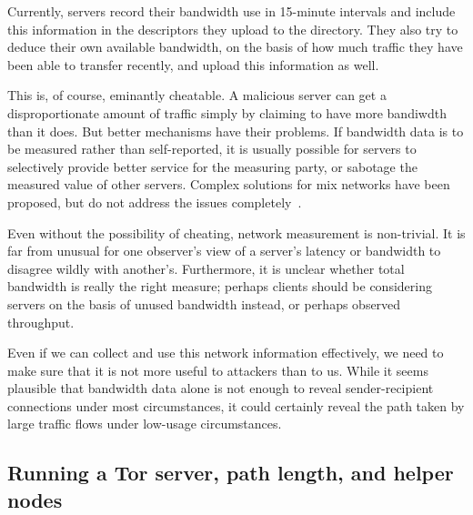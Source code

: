 \documentclass{llncs}
\begin{document}
Currently, servers record their bandwidth use in 15-minute intervals and
include this information in the descriptors they upload to the directory.
They also try to deduce their own available bandwidth, on the basis of how
much traffic they have been able to transfer recently, and upload this
information as well.

This is, of course, eminantly cheatable.  A malicious server can get a
disproportionate amount of traffic simply by claiming to have more bandiwdth
than it does.  But better mechanisms have their problems.  If bandwidth data
is to be measured rather than self-reported, it is usually possible for
servers to selectively provide better service for the measuring party, or
sabotage the measured value of other servers.  Complex solutions for
mix networks have been proposed, but do not address the issues
completely~\cite{mix-acc,casc-rep}.

Even without the possibility of cheating, network measurement is
non-trivial.  It is far from unusual for one observer's view of a server's
latency or bandwidth to disagree wildly with another's.  Furthermore, it is
unclear whether total bandwidth is really the right measure; perhaps clients
should be considering servers on the basis of unused bandwidth instead, or
perhaps observed throughput.



Even if we can collect and use this network information effectively, we need
to make sure that it is not more useful to attackers than to us.  While it
seems plausible that bandwidth data alone is not enough to reveal
sender-recipient connections under most circumstances, it could certainly
reveal the path taken by large traffic flows under low-usage circumstances.

\subsection{Running a Tor server, path length, and helper nodes}
\end{document}
